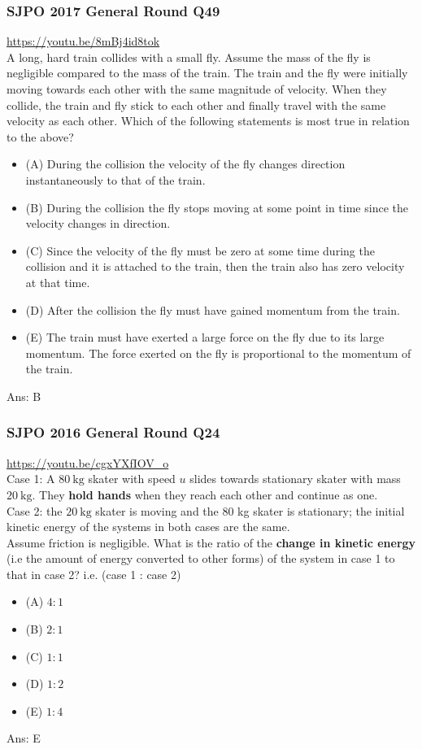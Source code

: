 \documentclass{article}
\begin{document}
\subsubsection{SJPO 2017 General Round Q49}
\url{https://youtu.be/8mBj4id8tok}\\
A long, hard train collides with a small fly. Assume the mass of the fly is negligible compared to the mass of the train. The train and the fly were initially moving towards each other with the same magnitude of velocity. When they collide, the train and fly stick to each other and finally travel with the same velocity as each other. Which of the following statements is most true in relation to the above?
\begin{itemize}
\item[] (A) During the collision the velocity of the fly changes direction instantaneously to that of the train.
\item[] (B) During the collision the fly stops moving at some point in time since the velocity changes in direction.
\item[] (C) Since the velocity of the fly must be zero at some time during the collision and it is attached to the train, then the train also has zero velocity at that time.
\item[] (D) After the collision the fly must have gained momentum from the train.
\item[] (E) The train must have exerted a large force on the fly due to its large momentum. The force exerted on the fly is proportional to the momentum of the train.
\end{itemize}
Ans: \ifpaper B \fi
\subsubsection{SJPO 2016 General Round Q24}
\url{https://youtu.be/cgxYXfIOV_o}\\
Case 1: A $80 \mathrm{~kg}$ skater with speed $u$ slides towards stationary skater with mass $20 \mathrm{~kg}$. They \textbf{hold hands} when they reach each other and continue as one. \\[10pt]
Case 2: the $20 \mathrm{~kg}$ skater is moving and the 80 kg skater is stationary; the initial kinetic energy of the systems in both cases are the same. \\[10pt]
Assume friction is negligible. What is the ratio of the \textbf{change in kinetic energy} (i.e the amount of energy converted to other forms) of the system in case 1 to that in case 2? i.e. (case 1 : case 2)
\begin{itemize}
\item[] (A) $4: 1$
\item[] (B) $2: 1$
\item[] (C) $1: 1$
\item[] (D) $1: 2$
\item[] (E) $1: 4$
\end{itemize}
Ans: \ifpaper E \fi
\end{document}
